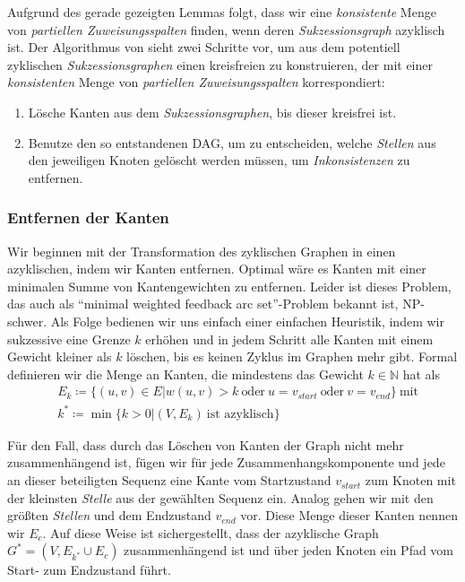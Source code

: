 Aufgrund des gerade gezeigten Lemmas folgt, dass wir eine \emph{konsistente} Menge von \emph{partiellen Zuweisungsspalten} finden, wenn deren \emph{Sukzessionsgraph} azyklisch ist. Der Algorithmus von \cite{pdc10} sieht zwei Schritte vor, um aus dem potentiell zyklischen \emph{Sukzessionsgraphen} einen kreisfreien zu konstruieren, der mit einer \emph{konsistenten} Menge von \emph{partiellen Zuweisungsspalten} korrespondiert:

\begin{enumerate}[topsep=0pt,itemsep=-1ex,partopsep=1ex,parsep=1ex]
	\item Lösche Kanten aus dem \emph{Sukzessionsgraphen}, bis dieser kreisfrei ist.
	\item Benutze den so entstandenen DAG, um zu entscheiden, welche \emph{Stellen} aus den jeweiligen Knoten gelöscht werden müssen, um \emph{Inkonsistenzen} zu entfernen.
\end{enumerate}

\subsubsection{Entfernen der Kanten}

Wir beginnen mit der Transformation des zyklischen Graphen in einen azyklischen, indem wir Kanten entfernen. Optimal wäre es Kanten mit einer minimalen Summe von Kantengewichten zu entfernen. Leider ist dieses Problem, das auch als \enquote{minimal weighted feedback arc set}-Problem bekannt ist, NP-schwer. Als Folge bedienen wir uns einfach einer einfachen Heuristik, indem wir sukzessive eine Grenze $k$ erhöhen und in jedem Schritt alle Kanten mit einem Gewicht kleiner als $k$ löschen, bis es keinen Zyklus im Graphen mehr gibt. Formal definieren wir die Menge an Kanten, die mindestens das Gewicht $k\in \mathbb{N}$ hat als 
\begin{equation}
\begin{split}
	& E_k \coloneqq \{(u,v)\in E | w(u,v) > k\: \text{oder}\: u = v_{start}\: \text{oder}\: v = v_{end}\}\: \text{mit} \\
	& k^* \coloneqq \min\{k > 0 | (V,E_k)\: \text{ist azyklisch}\}
\end{split}
\end{equation}

Für den Fall, dass durch das Löschen von Kanten der Graph nicht mehr zusammenhängend ist, fügen wir für jede Zusammenhangskomponente und jede an dieser beteiligten Sequenz eine Kante vom Startzustand $v_{start}$ zum Knoten mit der kleinsten \emph{Stelle} aus der gewählten Sequenz ein. Analog gehen wir mit den größten \emph{Stellen} und dem Endzustand $v_{end}$ vor. Diese Menge dieser Kanten nennen wir $E_c$. Auf diese Weise ist sichergestellt, dass der azyklische Graph $G^* = (V,E_{k^*}\cup E_c)$ zusammenhängend ist und über jeden Knoten ein Pfad vom Start- zum Endzustand führt.


